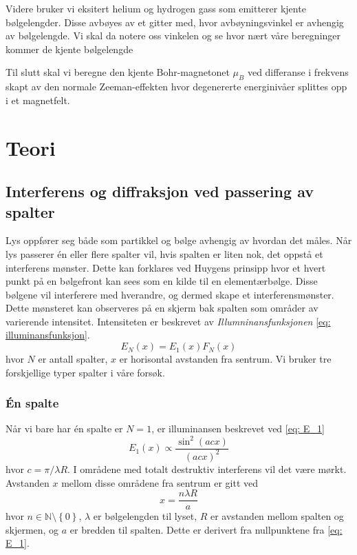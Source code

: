 \documentclass[reprint,norsk,notitlepage,floatfix]{revtex4-2}
\begin{document}
  Videre bruker vi eksitert helium og hydrogen gass som emitterer kjente bølgelengder. Disse avbøyes av et gitter med, hvor avbøyningsvinkel er avhengig av bølgelengde. Vi skal da notere oss vinkelen og se hvor nært våre beregninger kommer de kjente bølgelengde
  
  Til slutt skal vi beregne den kjente Bohr-magnetonet $μ_B$ ved differanse i frekvens skapt av den normale Zeeman-effekten hvor degenererte energinivåer splittes opp i et magnetfelt. 
  

\section{Teori} \label{sec: teori}
  \subsection{Interferens og diffraksjon ved passering av spalter}
    Lys oppfører seg både som partikkel og bølge avhengig av hvordan det måles. Når lys passerer én eller flere spalter vil, hvis spalten er liten nok, det oppstå et interferens mønster. Dette kan forklares ved Huygens prinsipp
    hvor et hvert punkt på en bølgefront kan sees som en kilde til en elementærbølge. Disse bølgene vil interferere med hverandre, og dermed skape et interferensmønster. Dette mønsteret kan observeres på en skjerm bak spalten som områder av varierende intensitet. Intensiteten er beskrevet av \textit{Illumninansfunksjonen} \cref{eq: illuminansfunksjon}. 
    \begin{equation}\label{eq: illuminansfunksjon}
      E_{N}(x) = E_1(x) F_N(x)
    \end{equation} 
    hvor $N$ er antall spalter, $x$ er horisontal avstanden fra sentrum. Vi bruker tre forskjellige typer spalter i våre forsøk. 
    
    \subsubsection*{Én spalte}
      Når vi bare har én spalte er $N = 1$, er illuminansen beskrevet ved \cref{eq: E_1} 
      \begin{equation}\label{eq: E_1}
        E_1(x) \propto \frac{\sin^2 (acx)}{(acx)^2}
      \end{equation}
      hvor $c = π / λR$. I områdene med totalt destruktiv interferens vil det være mørkt. Avstanden $x$ mellom disse områdene fra sentrum er gitt ved 
      \begin{equation}\label{eq: lysminima}
        x = \frac{nλR}{a}
      \end{equation}
      hvor $n ∈ ℕ \setminus \left\{0\right\}$, $λ$ er bølgelengden til lyset, $R$ er avstanden mellom spalten og skjermen, og $a$ er bredden til spalten. Dette er derivert fra nullpunktene fra  \cref{eq: E_1}. 
      
\end{document}
